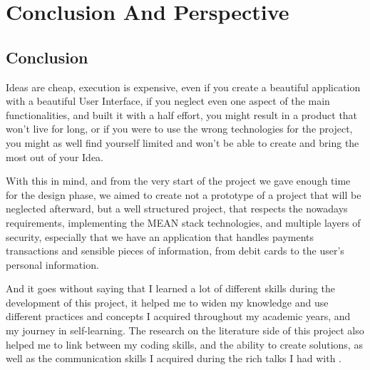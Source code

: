 \setcounter{mtc}{13}

\chapter*{Conclusion And Perspective}
\label{chap:conclusion}
\minitoc
{}%
\section*{Conclusion}
Ideas are cheap, execution is expensive,
even if you create a beautiful application with
a beautiful User Interface, if you neglect even one aspect of the main functionalities,
and built it with a half effort, you might result in a product that won't live for long,
or if you were to use the wrong technologies for the project, you might as well find yourself
limited and won't be able to create and bring the most out of your Idea.

With this in mind, and from the very start of the project we gave enough time for the design phase,
we aimed to create not a prototype of a project that will be neglected afterward, but a well structured
project, that respects the nowadays requirements, implementing the MEAN stack technologies, and 
multiple layers of security, especially that we have an application that handles payments transactions
and sensible pieces of information, from debit cards to the user's personal information.

And it goes without saying that I learned a lot of different skills during the development of this project,
it helped me to widen my knowledge and use different practices and concepts I acquired throughout my academic
years, and my journey in self-learning. The research on the literature side of this project also helped me 
to link between my coding skills, and the ability to create solutions, as well as the communication skills
I acquired during the rich talks I had with \mentor.

